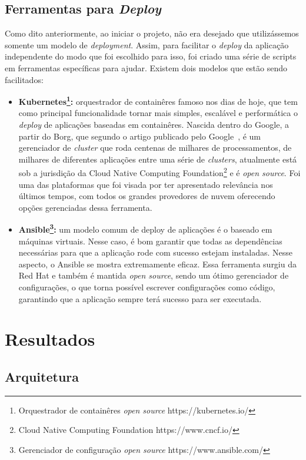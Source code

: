 \documentclass[11pt,twoside]{article}
\begin{document}
\subsection{Ferramentas para \emph{Deploy}}

Como dito anteriormente, ao iniciar o projeto, não era desejado que utilizássemos somente um modelo de \emph{deployment}. Assim, para facilitar o \emph{deploy} da aplicação independente
do modo que foi escolhido para isso, foi criado uma série de scripts em ferramentas específicas para ajudar. Existem dois modelos que estão sendo facilitados:

\begin{itemize}
  \item \textbf{Kubernetes\footnote{Orquestrador de containêres \emph{open source} https://kubernetes.io/}:} orquestrador de containêres famoso nos dias de hoje, que tem como principal funcionalidade tornar mais simples, escalável e performática o \emph{deploy}
  de aplicações baseadas em containêres. Nascida dentro do Google, a partir do Borg, que segundo o artigo publicado pelo Google~\cite{BORG}, é um gerenciador de \emph{cluster} que roda centenas de milhares de processamentos,
  de milhares de diferentes aplicações entre uma série de \emph{clusters},
  atualmente está sob a jurisdição da Cloud Native Computing Foundation\footnote{Cloud Native Computing Foundation https://www.cncf.io/} e é \emph{open source}. Foi uma
  das plataformas que foi visada por ter apresentado relevância nos últimos tempos, com todos os grandes provedores de nuvem oferecendo opções gerenciadas dessa 
  ferramenta.
  \item \textbf{Ansible\footnote{Gerenciador de configuração \emph{open source} https://www.ansible.com/}:} um modelo comum de deploy de aplicações é o baseado em máquinas virtuais. Nesse caso, é bom garantir que todas as dependências necessárias para que a 
  aplicação rode com sucesso estejam instaladas. Nesse aspecto, o Ansible se mostra extremamente eficaz. Essa ferramenta surgiu da Red Hat e também é mantida \emph{open source}, sendo um
  ótimo gerenciador de configurações, o que torna possível escrever configurações como código, garantindo que a aplicação sempre terá sucesso para ser executada.
\end{itemize}

\section{Resultados}

\subsection{Arquitetura}
\end{document}
